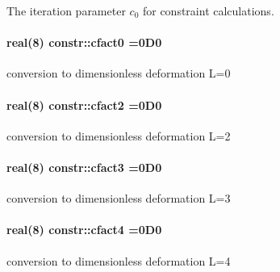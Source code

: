 The iteration parameter $ c_0 $ for constraint calculations. 

\paragraph[{\texorpdfstring{cfact0}{cfact0}}]{\setlength{\rightskip}{0pt plus 5cm}real(8) constr\+::cfact0 =0\+D0}\hypertarget{namespaceconstr_a17bf2198be05743793e7087222c361fc}{}\label{namespaceconstr_a17bf2198be05743793e7087222c361fc}


conversion to dimensionless deformation L=0 

\paragraph[{\texorpdfstring{cfact2}{cfact2}}]{\setlength{\rightskip}{0pt plus 5cm}real(8) constr\+::cfact2 =0\+D0}\hypertarget{namespaceconstr_a591b901ac5754962e45ddc92731c2146}{}\label{namespaceconstr_a591b901ac5754962e45ddc92731c2146}


conversion to dimensionless deformation L=2 

\paragraph[{\texorpdfstring{cfact3}{cfact3}}]{\setlength{\rightskip}{0pt plus 5cm}real(8) constr\+::cfact3 =0\+D0}\hypertarget{namespaceconstr_a15601a01ae3ca3eb08a1601dd4e438ce}{}\label{namespaceconstr_a15601a01ae3ca3eb08a1601dd4e438ce}


conversion to dimensionless deformation L=3 

\paragraph[{\texorpdfstring{cfact4}{cfact4}}]{\setlength{\rightskip}{0pt plus 5cm}real(8) constr\+::cfact4 =0\+D0}\hypertarget{namespaceconstr_ab4830c64d138d923cb6d11dfb07645f1}{}\label{namespaceconstr_ab4830c64d138d923cb6d11dfb07645f1}


conversion to dimensionless deformation L=4 

